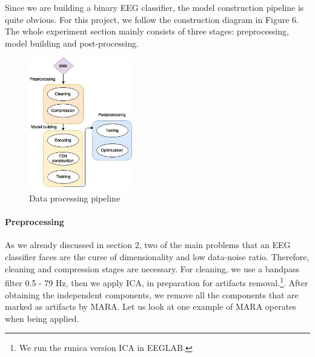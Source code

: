 \documentclass[a4paper,11pt,oneside]{article}
\begin{document}
Since we are building a binary EEG classifier, the model construction pipeline is quite obvious. For this project, we follow the construction diagram in Figure 6. The whole experiment section mainly consists of three stages: preprocessing, model building and post-processing.

	\begin{figure}[!h]
	\centering
	\includegraphics[width=0.40\textwidth]{img/dataflow}
	\caption{Data processing pipeline}
\end{figure}

	\paragraph{Preprocessing} As we already discussed in section 2, two of the main problems that an EEG classifier faces are the curse of dimensionality and low data-noise ratio. Therefore, cleaning and compression stages are necessary. For cleaning, we use a bandpass filter 0.5 - 79 Hz, then we apply ICA, in preparation for artifacts removal.\footnote{We run the runica version ICA in EEGLAB.}. After obtaining the independent components, we remove all the components that are marked as artifacts by MARA. Let us look at one example of MARA operates when being applied. 
\end{document}
